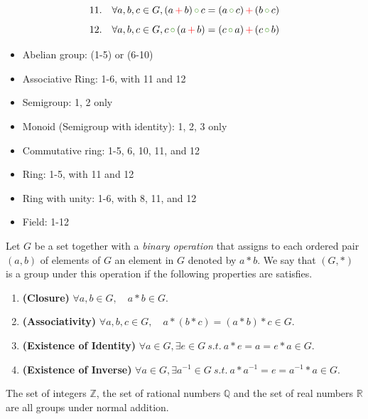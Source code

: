 \[11. \quad \forall a, b, c \in G, (a \, {\color{red} +}\, b) \, {\color{extinctGreen} \circ}\, c = (a \, {\color{extinctGreen} \circ}\, c) \, {\color{red} +}\, (b \, {\color{extinctGreen} \circ}\, c)  \]
\[12. \quad \forall a, b, c \in G, c \, {\color{extinctGreen} \circ}\, (a \, {\color{red} +}\, b) = (c \, {\color{extinctGreen} \circ}\, a) \, {\color{red} +}\, (c \, {\color{extinctGreen} \circ}\, b)  \]

\begin{itemize}
    \item Abelian group: (1-5) or (6-10)
    \item Associative Ring: 1-6, with 11 and 12
    \item Semigroup: 1, 2 only
    \item Monoid (Semigroup with identity): 1, 2, 3 only
    \item Commutative ring: 1-5, 6, 10, 11, and 12
    \item Ring: 1-5, with 11 and 12
    \item Ring with unity: 1-6, with 8, 11, and 12
    \item Field: 1-12
\end{itemize}

\begin{axiom}[Groups]
    Let $G$ be a set together with a \textit{binary operation} that assigns to each ordered pair $(a,b)$ of elements of $G$ an element in 
    $G$ denoted by $a * b$. We say that $(G, *)$ is a group under this operation if the following 
    properties are satisfies.
    \begin{enumerate}
        \item \textbf{(Closure)} $\forall a, b \in G, \quad a * b \in G$.
        \item \textbf{(Associativity)} $\forall a, b, c \in G, \quad a * (b * c) = (a * b) * c \in G$.
        \item \textbf{(Existence of Identity)} $\forall a \in G, \exists e \in G \> s.t. \> a * e = a = e * a \in G$.
        \item \textbf{(Existence of Inverse)} $\forall a \in G, \exists a^{-1} \in G \> s.t. \> a * a^{-1} = e = a^{-1} * a \in G$.
    \end{enumerate}
\end{axiom}

\begin{example}
    The set of integers $\mathbb{Z}$, the set of rational numbers $\mathbb{Q}$ and the set of real numbers $\mathbb{R}$ are all groups under 
    normal addition.
\end{example}

